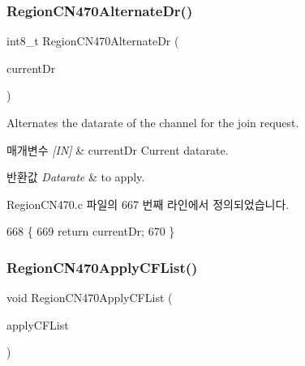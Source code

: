 \subsubsection{\texorpdfstring{Region\+C\+N470\+Alternate\+Dr()}{RegionCN470AlternateDr()}}
{\footnotesize\ttfamily int8\+\_\+t Region\+C\+N470\+Alternate\+Dr (\begin{DoxyParamCaption}\item[{int8\+\_\+t}]{current\+Dr }\end{DoxyParamCaption})}



Alternates the datarate of the channel for the join request. 


\begin{DoxyParams}{매개변수}
{\em \mbox{[}\+I\+N\mbox{]}} & current\+Dr Current datarate.\\
\hline
\end{DoxyParams}

\begin{DoxyRetVals}{반환값}
{\em Datarate} & to apply. \\
\hline
\end{DoxyRetVals}


Region\+C\+N470.\+c 파일의 667 번째 라인에서 정의되었습니다.


\begin{DoxyCode}
668 \{
669     \textcolor{keywordflow}{return} currentDr;
670 \}
\end{DoxyCode}
\mbox{\label{group___r_e_g_i_o_n_c_n470_gae0ca4a5d6bf63fdb278a132ec496649f}} 
\subsubsection{\texorpdfstring{Region\+C\+N470\+Apply\+C\+F\+List()}{RegionCN470ApplyCFList()}}
{\footnotesize\ttfamily void Region\+C\+N470\+Apply\+C\+F\+List (\begin{DoxyParamCaption}\item[{\mbox{\hyperlink{group___r_e_g_i_o_n_ga71588e9ad07e34b78fa91d51881fd3c6}{Apply\+C\+F\+List\+Params\+\_\+t}} $\ast$}]{apply\+C\+F\+List }\end{DoxyParamCaption})}



